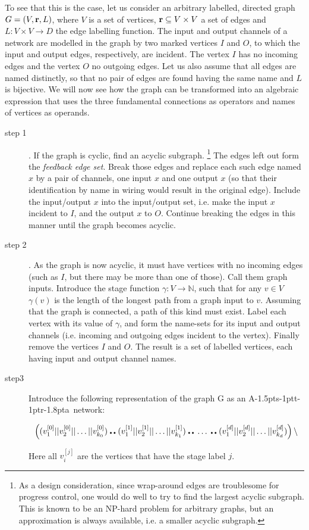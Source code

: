 \documentclass[11pt]{report}
\def\ak{{\textsf{A\kern-1.5pts\kern-1ptt\kern-1ptr\kern-1.8pta}}\kern-2pt{\it K\kern-2ptahn}}
\begin{document}
To see that this is the case, let us consider an arbitrary labelled, directed graph $G=(V,{\bf r}, L)$, where $V$ is a set of vertices, ${\bf r}\subseteq V\times V$ a set of edges and $L: V\times V\to D$ the edge labelling function. The input and output channels of a network are modelled in the graph by two marked vertices $I$ and $O$, to which the input and output edges, respectively, are incident. The vertex $I$  has no incoming edges and the vertex $O$ no outgoing edges. Let us also assume that all edges are named distinctly, so that no pair of edges are found having the same name and $L$ is bijective. We will now see how the graph can be transformed into an algebraic expression that uses the three fundamental connections as operators and names of vertices as operands.
\begin{description}
\item[step 1]. If the graph is cyclic, find an acyclic subgraph. \footnote{As a design consideration, since wrap-around edges are troublesome for progress control, one would do well to try to find the largest acyclic subgraph. This is known to be an NP-hard problem for arbitrary graphs, but an approximation is always available, i.e. a smaller acyclic subgraph.} The edges left out form the {\em feedback edge set}.  Break those edges and replace each such edge named $x$ by a pair of channels, one input $x$ and one output $x$ (so that their identification by name in wiring would result in the original edge). Include the input/output $x$ into the input/output set, i.e. make the input $x$ incident to  $I$, and the output $x$ to $O$. Continue breaking the edges in this manner until the graph becomes acyclic.

\item[step 2]. As the graph is now acyclic, it must have vertices with no incoming edges (such as $I$, but there may be more than one of those).
Call them graph inputs. Introduce the stage function $\gamma: V\to \mathbb{N}$, such that for any $v\in V$ $\gamma(v)$ is the length of the longest path from a graph input to $v$. Assuming that the graph is connected, a path of this kind must exist. Label each vertex with its value of $\gamma$, and form the name-sets for its input and output channels (i.e. incoming and outgoing edges incident to the vertex). Finally remove the vertices $I$ and $O$. The result is a set of labelled vertices, each having input and output channel names.

\item[step3] Introduce the following representation of the graph G as an \ak\ network:

\[
\left ((v^{[0]}_1 || v^{[0]}_2 || \ldots || v^{[0]}_{k_0})\,\hbox{\bf\Large..}\, (v^{[1]}_1|| v^{[1]}_2 || \ldots || v^{[1]}_{k_1}) \,\hbox{\bf\Large..}\, \ldots \,\hbox{\bf\Large..}\, (v^{[d]}_1 || v^{[d]}_2 || \ldots || v^{[d]}_{k_d})\right) \backslash
\]

Here all $v^{[j]}_{i}$ are the vertices that have the stage label $j$.
\end{description}
\end{document}
